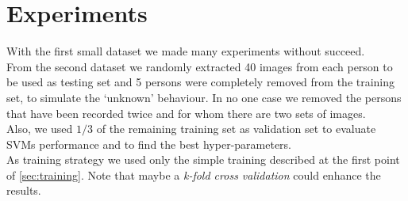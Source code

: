 \documentclass{article}
\begin{document}
\section{Experiments}
With the first small dataset we made many experiments without succeed.
\\
From the second dataset we randomly extracted 40 images from each person to be
used as testing set and 5 persons were completely removed from the training
set, to simulate the `unknown' behaviour. In no one case we removed the persons
that have been recorded twice and for whom there are two sets of images.
\\
Also, we used $1/3$ of the remaining training set as validation set to evaluate
SVMs performance and to find the best hyper-parameters.
\\
As training strategy we used only the simple training described at the first
point of \ref{sec:training}. Note that maybe a \textit{k-fold cross validation}
could enhance the results.
\end{document}
